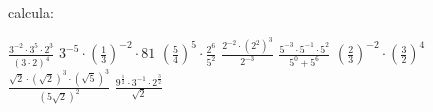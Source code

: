 \documentclass[spanish, 11pt]{exam}
\begin{document}
    \begin{questions}
    
    \question calcula: 
    \begin{multicols}{3} 
    \begin{parts} $ \frac{{{3^{ - 2}} \cdot {3^5} \cdot {2^3}}}{{{{( {3 \cdot 2} )}^4}}} $  $ {3^{ - 5}} \cdot {( {\frac{1}{3}} )^{ - 2}} \cdot 81 $  $ {( {\frac{5}{4}} )^5} \cdot \frac{{{2^6}}}{{{5^2}}} $  $ \frac{{{2^{ - 2}} \cdot {{( {{2^2}} )}^3}}}{{{2^{ - 3}}}} $  $ \frac{{{5^{ - 3}} \cdot {5^{ - 1}} \cdot {5^2}}}{{{5^0} + {5^6}}} $  $ {( {\frac{2}{3}} )^{ - 2}} \cdot {( {\frac{3}{2}} )^4} $  $ \frac{{\sqrt {2}  \cdot {{( {\sqrt {2} } )}^3} \cdot {{( {\sqrt {5} } )}^3}}}{{{{( {5\sqrt{2} } )}^2}}} $  $ \frac{{{9^{\frac{1}{2}}} \cdot {3^{ - 1}} \cdot {2^{\frac{3}{2}}}}}{{\sqrt {2} }} $ 
    \end{parts}
    \end{multicols}
    
    \end{questions}
    
\end{document}
